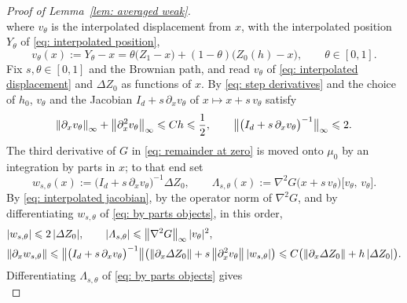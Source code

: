 \documentclass[namedate,webpdf,imanum]{ima-authoring-template}
\newcommand{\Le}{\leqslant}
\theoremstyle{thmstyletwo}
\numberwithin{equation}{section}
\begin{document}
\begin{proof}[Proof of Lemma~\ref{lem: averaged weak}]
\begin{equation}
        \label{eq: remainder at zero}
    \end{equation}
    where $v_\theta$ is the interpolated displacement from $x$, with the interpolated position $Y_\theta$ of \eqref{eq: interpolated position},
    \begin{equation}
        v_\theta(x) := Y_\theta - x = \theta \bigl( Z_1 - x \bigr) + (1 - \theta) \bigl( Z_0(h) - x \bigr) , \qquad \theta \in [0, 1] .
        \label{eq: interpolated displacement}
    \end{equation}
    Fix $s,\theta\in[0,1]$ and the Brownian path, and read $v_\theta$ of \eqref{eq: interpolated displacement} and $\Delta Z_0$ as functions of $x$. By \eqref{eq: step derivatives} and the choice of $h_0$, $v_\theta$ and the Jacobian $I_d + s\, \partial_x v_\theta$ of $x \mapsto x + s\, v_\theta$ satisfy
    \begin{equation}
        \norm{\partial_x v_\theta}_\infty + \norm{\partial_x^2 v_\theta}_\infty \Le C h \Le \frac12 , \qquad
        \bigl\| \bigl( I_d + s\, \partial_x v_\theta \bigr)^{-1} \bigr\|_\infty \Le 2 .
        \label{eq: interpolated jacobian}
    \end{equation}
    The third derivative of $G$ in \eqref{eq: remainder at zero} is moved onto $\mu_0$ by an integration by parts in $x$; to that end set
    \begin{equation}
        w_{s,\theta}(x) := \bigl( I_d + s\, \partial_x v_\theta \bigr)^{-1} \Delta Z_0 , \qquad
        \Lambda_{s,\theta}(x) := \nabla^2 G\bigl( x + s\, v_\theta \bigr) \bigl[ v_\theta ,\, v_\theta \bigr] .
        \label{eq: by parts objects}
    \end{equation}
    By \eqref{eq: interpolated jacobian}, by the operator norm of $\nabla^2 G$, and by differentiating $w_{s,\theta}$ of \eqref{eq: by parts objects}, in this order,
    \begin{align}
        & |w_{s,\theta}| \Le 2\, |\Delta Z_0| , \qquad |\Lambda_{s,\theta}| \Le \norm{\nabla^2 G}_\infty\, |v_\theta|^2 , \notag \\
        & \norm{\partial_x w_{s,\theta}} \Le \bigl\| \bigl( I_d + s\, \partial_x v_\theta \bigr)^{-1} \bigr\| \bigl( \norm{\partial_x \Delta Z_0} + s\, \norm{\partial_x^2 v_\theta}\, |w_{s,\theta}| \bigr) \Le C \bigl( \norm{\partial_x \Delta Z_0} + h\, |\Delta Z_0| \bigr) .
        \label{eq: by parts bounds}
    \end{align}
    Differentiating $\Lambda_{s,\theta}$ of \eqref{eq: by parts objects} gives
    \begin{equation}

\end{equation}
\end{proof}
\end{document}
